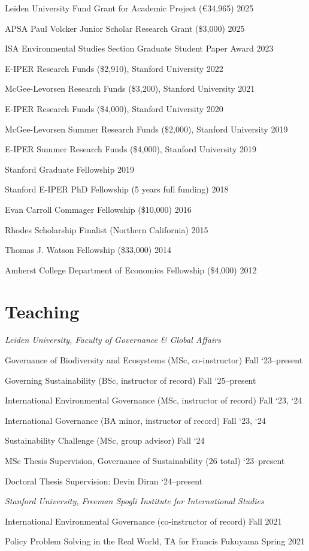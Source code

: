 \documentclass[11pt, letterpaper]{article}
\newcommand{\cventry}[2]{\noindent #1 \hfill #2\par}
\begin{document}
\cventry{Leiden University Fund Grant for Academic Project (\euro 34,965)}{2025}
\cventry{APSA Paul Volcker Junior Scholar Research Grant (\$3,000)}{2025}
\cventry{ISA Environmental Studies Section Graduate Student Paper Award}{2023}
\cventry{E-IPER Research Funds (\$2,910), Stanford University}{2022}
\cventry{McGee-Levorsen Research Funds (\$3,200), Stanford University}{2021}
\cventry{E-IPER Research Funds (\$4,000), Stanford University}{2020}
\cventry{McGee-Levorsen Summer Research Funds (\$2,000), Stanford University}{2019}
\cventry{E-IPER Summer Research Funds (\$4,000), Stanford University}{2019}
\cventry{Stanford Graduate Fellowship}{2019}
\cventry{Stanford E-IPER PhD Fellowship (5 years full funding)}{2018}
\cventry{Evan Carroll Commager Fellowship (\$10,000)}{2016}
\cventry{Rhodes Scholarship Finalist (Northern California)}{2015}
\cventry{Thomas J. Watson Fellowship (\$33,000)}{2014}
\cventry{Amherst College Department of Economics Fellowship (\$4,000)}{2012}

\section{Teaching}

\textit{Leiden University, Faculty of Governance \& Global Affairs}

\vspace{0.3em}

\cventry{Governance of Biodiversity and Ecosystems (MSc, co-instructor)}{Fall `23--present}
\cventry{Governing Sustainability (BSc, instructor of record)}{Fall `25--present}
\cventry{International Environmental Governance (MSc, instructor of record)}{Fall `23, `24}
\cventry{International Governance (BA minor, instructor of record)}{Fall `23, `24}
\cventry{Sustainability Challenge (MSc, group advisor)}{Fall `24}
\cventry{MSc Thesis Supervision, Governance of Sustainability (26 total)}{`23--present}
\cventry{Doctoral Thesis Supervision: Devin Diran}{`24--present}

\vspace{0.8em}

\textit{Stanford University, Freeman Spogli Institute for International Studies}

\vspace{0.3em}

\cventry{International Environmental Governance (co-instructor of record)}{Fall 2021}
\cventry{Policy Problem Solving in the Real World, TA for Francis Fukuyama}{Spring 2021}
\end{document}

